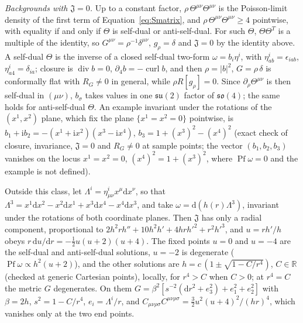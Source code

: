 \emph{Backgrounds with \(\mathfrak J=0\).} Up to a constant factor, \(\rho\,\Theta^{\mu\nu}\Theta^{\mu\nu}\) is the Poisson-limit density of the first term of Equation~\eqref{eq:Smatrix}, and \(\rho\,\Theta^{\mu\nu}\Theta^{\mu\nu}\ge4\) pointwise, with equality if and only if \(\Theta\) is self-dual or anti-self-dual. For such \(\Theta\), \(\Theta\Theta^T\) is a multiple of the identity, so \(G^{\mu\nu}=\rho^{-1}\delta^{\mu\nu}\), \(g_\rho=\delta\) and \(\mathfrak J=0\) by the identity above. A self-dual \(\Theta\) is the inverse of a closed self-dual two-form \(\omega=b_i\eta^i\), with \(\eta^i_{ab}=\epsilon_{iab}\), \(\eta^i_{a4}=\delta_{ia}\); closure is \(\operatorname{div}b=0\), \(\partial_4b=-\operatorname{curl}b\), and then \(\rho=|b|^2\), \(G=\rho\,\delta\) is conformally flat with \(R_G\ne0\) in general, while \(\rho R[g_\rho]=0\). Since \(\partial_\rho\Theta^{\mu\nu}\) is then self-dual in \((\mu\nu)\), \(b_\sigma\) takes values in one \(\mathfrak{su}(2)\) factor of \(\mathfrak{so}(4)\); the same holds for anti-self-dual \(\Theta\). An example invariant under the rotations of the \((x^1,x^2)\) plane, which fix the plane \(\{x^1=x^2=0\}\) pointwise, is \(b_1+\mathrm ib_2=-(x^1+\mathrm ix^2)(x^3-\mathrm ix^4)\), \(b_3=1+(x^3)^2-(x^4)^2\) (exact check of closure, invariance, \(\mathfrak J=0\) and \(R_G\ne0\) at sample points; the vector \((b_1,b_2,b_3)\) vanishes on the locus \(x^1=x^2=0\), \((x^4)^2=1+(x^3)^2\), where \(\operatorname{Pf}\omega=0\) and the example is not defined).

Outside this class, let \(\Lambda^i=\eta^i_{\mu\nu}x^\mu\mathrm dx^\nu\), so that \(\Lambda^3=x^1\mathrm dx^2-x^2\mathrm dx^1+x^3\mathrm dx^4-x^4\mathrm dx^3\), and take \(\omega=\mathrm d(h(r)\Lambda^3)\), invariant under the rotations of both coordinate planes. Then \(\mathfrak J\) has only a radial component, proportional to \(2h^2rh''+10h^2h'+4hrh'^2+r^2h'^3\), and \(u=rh'/h\) obeys \(r\,\mathrm du/\mathrm dr=-\tfrac12u(u+2)(u+4)\). The fixed points \(u=0\) and \(u=-4\) are the self-dual and anti-self-dual solutions, \(u=-2\) is degenerate (\(\operatorname{Pf}\omega\propto h^2(u+2)\)), and the other solutions are \(h=c\,(1\pm\sqrt{1-C/r^4})\), \(C\in\mathbb R\) (checked at generic Cartesian points), locally, for \(r^4>C\) when \(C>0\); at \(r^4=C\) the metric \(G\) degenerates. On them \(G=\beta^2[s^{-2}(\mathrm dr^2+e_3^2)+e_1^2+e_2^2]\) with \(\beta=2h\), \(s^2=1-C/r^4\), \(e_i=\Lambda^i/r\), and \(C_{\mu\nu\rho\sigma}C^{\mu\nu\rho\sigma}=\tfrac32u^2(u+4)^2/(hr)^4\), which vanishes only at the two end points.

